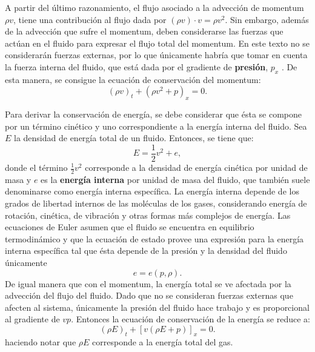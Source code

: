 A partir del último razonamiento, el flujo asociado a la advección de momentum $\rho v$, tiene una contribución al flujo dada por $(\rho v) \cdot v = \rho v^2$. Sin embargo, además de la advección que sufre el momentum, deben considerarse las fuerzas que actúan en el fluido para expresar el flujo total del momentum. En este texto no se considerarán fuerzas externas, por lo que únicamente habría que tomar en cuenta la fuerza interna del fluido, que está dada por el gradiente de \textbf{presión}, $p_x$ \cite{LeVeque}. De esta manera, se consigue la ecuación de conservación del momentum:
\begin{equation}
	(\rho v)_t + (\rho v^{2} + p)_{x} = 0.
	\label{eq:momentum-euler}
\end{equation}

Para derivar la conservación de energía, se debe considerar que ésta se compone por un término cinético y uno correspondiente a la energía interna del fluido. Sea $E$ la densidad de energía total de un fluido. Entonces, se tiene que:
\begin{equation}
	E = \frac{1}{2} v^{2} + e,
	\label{eq:energia}
\end{equation}
donde el término $\frac{1}{2} v^{2}$ corresponde a la densidad de energía cinética por unidad de masa y $e$ es la \textbf{energía interna} por unidad de masa del fluido, que también suele denominarse como energía interna específica. La energía interna depende de los grados de libertad internos de las moléculas de los gases, considerando energía de rotación, cinética, de vibración y otras formas más complejos de energía. Las ecuaciones de Euler asumen que el fluido se encuentra en equilibrio termodinámico y que la ecuación de estado provee una expresión para la energía interna específica tal que ésta depende de la presión y la densidad del fluido únicamente
\begin{equation}
	e = e(p, \rho).
\end{equation}
De igual manera que con el momentum, la energía total se ve afectada por la advección del flujo del fluido. Dado que no se consideran fuerzas externas que afecten al sistema, únicamente la presión del fluido hace trabajo y es proporcional al gradiente de $vp$. Entonces la ecuación de conservación de la energía se reduce a:
\begin{equation}
	(\rho E)_{t} + [v(\rho E + p)]_{x} = 0.
	\label{eq:energia-euler}
\end{equation}
haciendo notar que $\rho E$ corresponde a la energía total del gas.

